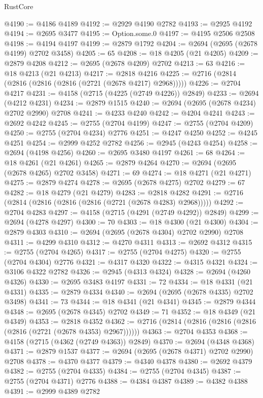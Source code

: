 \begin{lexlean}{RustCore}
\begin{coremodule}
@4190 := @4186 @4189
@4192 := @2929 @4190 @2782
@4193 := @2925 @4192
@4194 := @2695 @3477
@4195 := Option.some.{0}
@4197 := @4195 @2506 @2508
@4198 := @4194 @4197
@4199 := @2879 @1792
@4204 := @2694 (@2695 (@2678 @4199) @2702 @3458)
@4205 := 65
@4208 := @18 @4205 (@21 @4205)
@4209 := @2879 @4208
@4212 := @2695 (@2678 @4209) @2702
@4213 := 63
@4216 := @18 @4213 (@21 @4213)
@4217 := @2818 @4216
@4225 := @2716 (@2814 (@2816 (@2816 (@2816 (@2721 (@2678 @4217) @2968)))))
@4226 := @2704 @4217
@4231 := @4158 (@2715 (@4225 (@2749 @4226)) @2849)
@4233 := @2694 (@4212 @4231)
@4234 := @2879 @1515
@4240 := @2694 (@2695 (@2678 @4234) @2702 @2990) @2708
@4241 := @4233 @4240
@4242 := @4204 @4241
@4243 := @2692 @4242
@4245 := @2755 (@2704 @4199)
@4247 := @2755 (@2704 @4209)
@4250 := @2755 (@2704 @4234) @2776
@4251 := @4247 @4250
@4252 := @4245 @4251
@4254 := @2999 @4252 @2782
@4256 := @2945 (@4243 @4254)
@4258 := @2694 (@4198 @4256)
@4260 := @2695 @3480 @4197
@4261 := 68
@4264 := @18 @4261 (@21 @4261)
@4265 := @2879 @4264
@4270 := @2694 (@2695 (@2678 @4265) @2702 @3458)
@4271 := 69
@4274 := @18 @4271 (@21 @4271)
@4275 := @2879 @4274
@4278 := @2695 (@2678 @4275) @2702
@4279 := 67
@4282 := @18 @4279 (@21 @4279)
@4283 := @2818 @4282
@4291 := @2716 (@2814 (@2816 (@2816 (@2816 (@2721 (@2678 @4283) @2968)))))
@4292 := @2704 @4283
@4297 := @4158 (@2715 (@4291 (@2749 @4292)) @2849)
@4299 := @2694 (@4278 @4297)
@4300 := 70
@4303 := @18 @4300 (@21 @4300)
@4304 := @2879 @4303
@4310 := @2694 (@2695 (@2678 @4304) @2702 @2990) @2708
@4311 := @4299 @4310
@4312 := @4270 @4311
@4313 := @2692 @4312
@4315 := @2755 (@2704 @4265)
@4317 := @2755 (@2704 @4275)
@4320 := @2755 (@2704 @4304) @2776
@4321 := @4317 @4320
@4322 := @4315 @4321
@4324 := @3106 @4322 @2782
@4326 := @2945 (@4313 @4324)
@4328 := @2694 (@4260 @4326)
@4330 := @2695 @3483 @4197
@4331 := 72
@4334 := @18 @4331 (@21 @4331)
@4335 := @2879 @4334
@4340 := @2694 (@2695 (@2678 @4335) @2702 @3498)
@4341 := 73
@4344 := @18 @4341 (@21 @4341)
@4345 := @2879 @4344
@4348 := @2695 (@2678 @4345) @2702
@4349 := 71
@4352 := @18 @4349 (@21 @4349)
@4353 := @2818 @4352
@4362 := @2716 (@2814 (@2816 (@2816 (@2816 (@2816 (@2721 (@2678 @4353) @2967))))))
@4363 := @2704 @4353
@4368 := @4158 (@2715 (@4362 (@2749 @4363)) @2849)
@4370 := @2694 (@4348 @4368)
@4371 := @2879 @1537
@4377 := @2694 (@2695 (@2678 @4371) @2702 @2990) @2708
@4378 := @4370 @4377
@4379 := @4340 @4378
@4380 := @2692 @4379
@4382 := @2755 (@2704 @4335)
@4384 := @2755 (@2704 @4345)
@4387 := @2755 (@2704 @4371) @2776
@4388 := @4384 @4387
@4389 := @4382 @4388
@4391 := @2999 @4389 @2782

\end{coremodule}
\end{lexlean}

